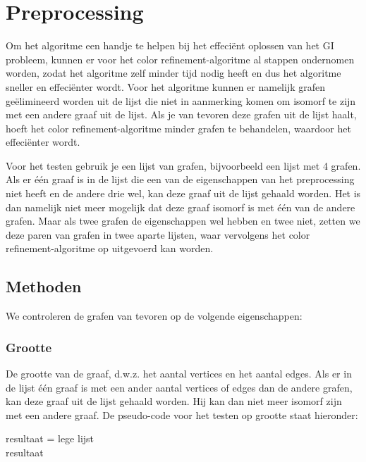 \documentclass{article}
\begin{document}

\section{Preprocessing}
Om het algoritme een handje te helpen bij het effeciënt oplossen van het GI probleem, kunnen er voor het color refinement-algoritme al stappen ondernomen worden, zodat het algoritme zelf minder tijd nodig heeft en dus het algoritme sneller en effeciënter wordt.
Voor het algoritme kunnen er namelijk grafen geëlimineerd worden uit de lijst die niet in aanmerking komen om isomorf te zijn met een andere graaf uit de lijst. Als je van tevoren deze grafen uit de lijst haalt, hoeft het color refinement-algoritme minder grafen te behandelen, waardoor het effeciënter wordt.

Voor het testen gebruik je een lijst van grafen, bijvoorbeeld een lijst met 4 grafen. Als er \'e\'en graaf is in de lijst die een van de eigenschappen van het preprocessing niet heeft en de andere drie wel, kan deze graaf uit de lijst gehaald worden. Het is dan namelijk niet meer mogelijk dat deze graaf isomorf is met \'e\'en van de andere grafen. Maar als twee grafen de eigenschappen wel hebben en twee niet, zetten we deze paren van grafen in twee aparte lijsten, waar vervolgens het color refinement-algoritme op uitgevoerd kan worden.

\subsection{Methoden}
We controleren de grafen van tevoren op de volgende eigenschappen:
\subsubsection{Grootte}
De grootte van de graaf, d.w.z. het aantal vertices en het aantal edges. Als er in de lijst één graaf is met een ander aantal vertices of edges dan de andere grafen, kan deze graaf uit de lijst gehaald worden. Hij kan dan niet meer isomorf zijn met een andere graaf. De pseudo-code voor het testen op grootte staat hieronder:\\

\begin{algorithm}[H]
	resultaat = lege lijst\\
	\Return resultaat
\end{algorithm}
\end{document}
